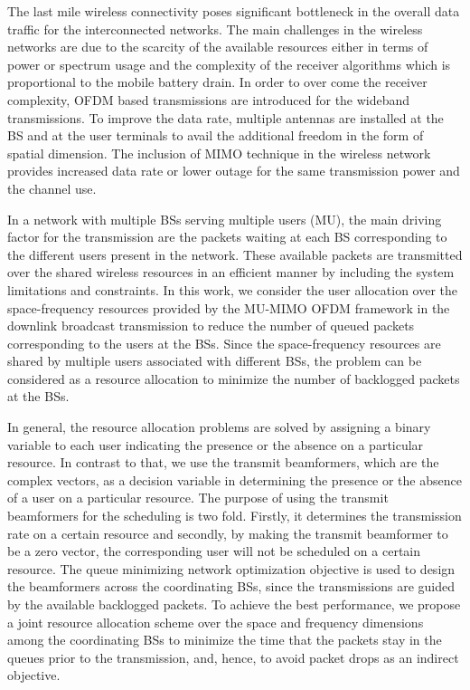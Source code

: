 
The last mile wireless connectivity poses significant bottleneck in the overall data traffic for the interconnected networks. The main challenges in the wireless networks are due to the scarcity of the available resources either in terms of power or spectrum usage and the complexity of the receiver algorithms which is proportional to the mobile battery drain. In order to over come the receiver complexity, \ac{OFDM} based transmissions are introduced for the wideband transmissions. To improve the data rate, multiple antennas are installed at the \ac{BS} and at the user terminals to avail the additional freedom in the form of spatial dimension. The inclusion of \ac{MIMO} technique in the wireless network provides increased data rate or lower outage for the same transmission power and the channel use.

In a network with multiple \acp{BS} serving multiple users (\acs{MU}), the main driving factor for the transmission are the packets waiting at each \ac{BS} corresponding to the different users present in the network. These available packets are transmitted over the shared wireless resources in an efficient manner by including the system limitations and constraints. In this work, we consider the user allocation over the space-frequency resources provided by the \ac{MU-MIMO} \ac{OFDM} framework in the downlink broadcast transmission to reduce the number of queued packets corresponding to the users at the \acp{BS}. Since the space-frequency resources are shared by multiple users associated with different \acp{BS}, the problem can be considered as a resource allocation to minimize the number of backlogged packets at the \acp{BS}.

In general, the resource allocation problems are solved by assigning a binary variable to each user indicating the presence or the absence on a particular resource. In contrast to that, we use the transmit beamformers, which are the complex vectors, as a decision variable in determining the presence or the absence of a user on a particular resource. The purpose of using the transmit beamformers for the scheduling is two fold. Firstly, it determines the transmission rate on a certain resource and secondly, by making the transmit beamformer to be a zero vector, the corresponding user will not be scheduled on a certain resource. The queue minimizing network optimization objective is used to design the beamformers across the coordinating \acp{BS}, since the transmissions are guided by the available backlogged packets. To achieve the best performance, we propose a joint resource allocation scheme over the space and frequency dimensions among the coordinating \acp{BS} to minimize the time that the packets stay in the queues prior to the transmission, and, hence, to avoid packet drops as an indirect objective.

